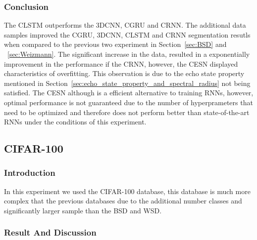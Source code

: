 \documentclass{WitsPhysicsReport}
\begin{document}
\subsubsection{Conclusion}



The CLSTM outperforms the 3DCNN, CGRU and CRNN. The additional data samples improved the CGRU, 3DCNN, CLSTM and CRNN segmentation resutls when compared to the previous two experiment in Section~\ref{sec:BSD} and ~\ref{sec:Weizmann}. The significant increase in the data, resulted in a exponentially improvement in the performance if the CRNN, however, the CESN displayed characteristics of overfitting.  This observation is due to the echo state property mentioned in Section~\ref{sec:echo_state_property_and_spectral_radius} not being satisfied. The CESN although is a efficient alternative to training RNNs, however, optimal performance is not guaranteed due to the number of hyperprameters that need to be optimized and therefore does not perform better than state-of-the-art RNNs under the conditions of this experiment.

\newpage




\subsection{CIFAR-100}
\label{sec:cifar_100}

\subsubsection{Introduction}

In this experiment we used the CIFAR-100 database, this database is much more complex that the previous databases due to the additional number classes and significantly larger sample than the BSD and WSD.

\subsubsection{Result And Discussion}
\end{document}
